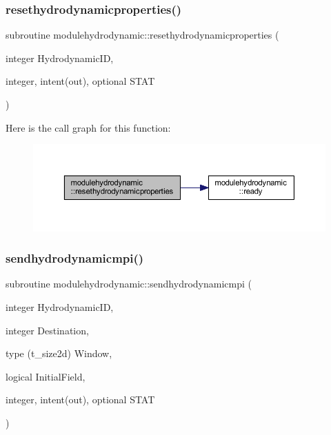 \subsubsection{\texorpdfstring{resethydrodynamicproperties()}{resethydrodynamicproperties()}}
{\footnotesize\ttfamily subroutine modulehydrodynamic\+::resethydrodynamicproperties (\begin{DoxyParamCaption}\item[{integer}]{Hydrodynamic\+ID,  }\item[{integer, intent(out), optional}]{S\+T\+AT }\end{DoxyParamCaption})\hspace{0.3cm}{\ttfamily [private]}}

Here is the call graph for this function\+:\nopagebreak
\begin{figure}[H]
\begin{center}
\leavevmode
\includegraphics[width=350pt]{namespacemodulehydrodynamic_a81fe705d1430f64e261259b13a8b46f8_cgraph}
\end{center}
\end{figure}
\mbox{\label{namespacemodulehydrodynamic_a81c72f539c0330e132af0d9586b8a1b4}} 
\subsubsection{\texorpdfstring{sendhydrodynamicmpi()}{sendhydrodynamicmpi()}}
{\footnotesize\ttfamily subroutine modulehydrodynamic\+::sendhydrodynamicmpi (\begin{DoxyParamCaption}\item[{integer}]{Hydrodynamic\+ID,  }\item[{integer}]{Destination,  }\item[{type (t\+\_\+size2d)}]{Window,  }\item[{logical}]{Initial\+Field,  }\item[{integer, intent(out), optional}]{S\+T\+AT }\end{DoxyParamCaption})\hspace{0.3cm}{\ttfamily [private]}}

